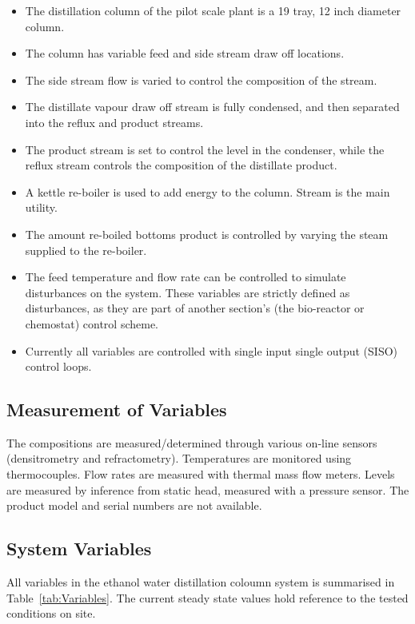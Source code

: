 \begin{itemize}
	\item The distillation column of the pilot scale plant is a 19 tray, 12 inch diameter column. 
	\item The column has variable feed and side stream draw off locations. 
	\item The side stream flow is varied to control the composition of the stream. 
	\item The distillate vapour draw off stream is fully condensed, and then separated into the reflux and product streams. 
	\item The product stream is set to control the level in the condenser, while the reflux stream controls the composition of the distillate product. 
	\item A kettle re-boiler is used to add energy to the column. Stream is the main utility. 
	\item The amount re-boiled bottoms product is controlled by varying the steam supplied to the re-boiler. 
	\item The feed temperature and flow rate can be controlled to simulate disturbances on the system. These variables are strictly defined as disturbances, as they are part of another section's (the bio-reactor or chemostat) control scheme.
	\item Currently all variables are controlled with single input single output (SISO) control loops.
	
\end{itemize}

\subsection{Measurement of Variables}

The compositions are measured/determined through various on-line sensors (densitrometry and refractometry). Temperatures are monitored using thermocouples. Flow rates are measured with thermal mass flow meters. Levels are measured by inference from static head, measured with a pressure sensor. The product model and serial numbers are not available.


\subsection{System Variables}

All variables in the ethanol water distillation coloumn system is summarised in Table~\ref{tab:Variables}. The current steady state values hold reference to the tested conditions on site.

